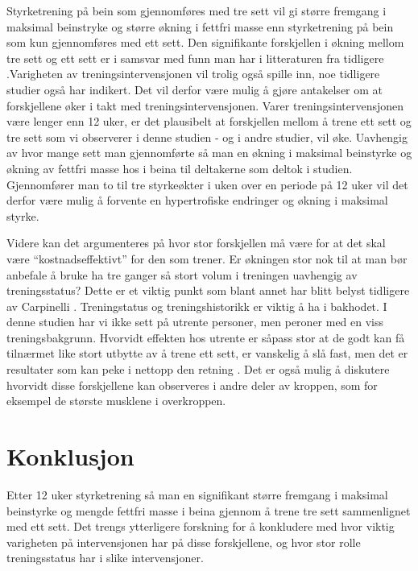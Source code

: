 \documentclass[
]{book}
\begin{document}
Styrketrening på bein som gjennomføres med tre sett vil gi større fremgang i maksimal beinstryke og større økning i fettfri masse enn styrketrening på bein som kun gjennomføres med ett sett. Den signifikante forskjellen i økning mellom tre sett og ett sett er i samsvar med funn man har i litteraturen fra tidligere \citep{rhea2002, munn2005, fröhlich2010}.Varigheten av treningsintervensjonen vil trolig også spille inn, noe tidligere studier også har indikert\citep{rhea2002}. Det vil derfor være mulig å gjøre antakelser om at forskjellene øker i takt med treningsintervensjonen. Varer treningsintervensjonen være lenger enn 12 uker, er det plausibelt at forskjellen mellom å trene ett sett og tre sett som vi observerer i denne studien - og i andre studier, vil øke. Uavhengig av hvor mange sett man gjennomførte så man en økning i maksimal beinstyrke og økning av fettfri masse hos i beina til deltakerne som deltok i studien. Gjennomfører man to til tre styrkeøkter i uken over en periode på 12 uker vil det derfor være mulig å forvente en hypertrofiske endringer og økning i maksimal styrke.

Videre kan det argumenteres på hvor stor forskjellen må være for at det skal være ``kostnadseffektivt'' for den som trener. Er økningen stor nok til at man bør anbefale å bruke ha tre ganger så stort volum i treningen uavhengig av treningsstatus? Dette er et viktig punkt som blant annet har blitt belyst tidligere av Carpinelli \citep{carpinelli1998}. Treningstatus og treningshistorikk er viktig å ha i bakhodet. I denne studien har vi ikke sett på utrente personer, men peroner med en viss treningsbakgrunn. Hvorvidt effekten hos utrente er såpass stor at de godt kan få tilnærmet like stort utbytte av å trene ett sett, er vanskelig å slå fast, men det er resultater som kan peke i nettopp den retning \citep{radaelli2014}. Det er også mulig å diskutere hvorvidt disse forskjellene kan observeres i andre deler av kroppen, som for eksempel de største musklene i overkroppen\citep{hass2000}.

\hypertarget{konklusjon}{%
\section{Konklusjon}\label{konklusjon}}

Etter 12 uker styrketrening så man en signifikant større fremgang i maksimal beinstyrke og mengde fettfri masse i beina gjennom å trene tre sett sammenlignet med ett sett. Det trengs ytterligere forskning for å konkludere med hvor viktig varigheten på intervensjonen har på disse forskjellene, og hvor stor rolle treningsstatus har i slike intervensjoner.

  
\end{document}
